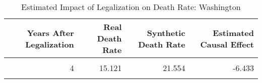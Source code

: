 \begin{table}[H]

\caption{\label{tab:causal_est_table_washington}Estimated Impact of Legalization on Death Rate: Washington}
\centering
\begin{tabular}[t]{rrrr}
\toprule
Years After Legalization & Real Death Rate & Synthetic Death Rate & Estimated Causal Effect\\
\midrule
\cellcolor{gray!6}{2} & \cellcolor{gray!6}{13.864} & \cellcolor{gray!6}{16.167} & \cellcolor{gray!6}{-2.303}\\
4 & 15.121 & 21.554 & -6.433\\
\cellcolor{gray!6}{6} & \cellcolor{gray!6}{15.447} & \cellcolor{gray!6}{21.819} & \cellcolor{gray!6}{-6.372}\\
\bottomrule
\end{tabular}
\end{table}
